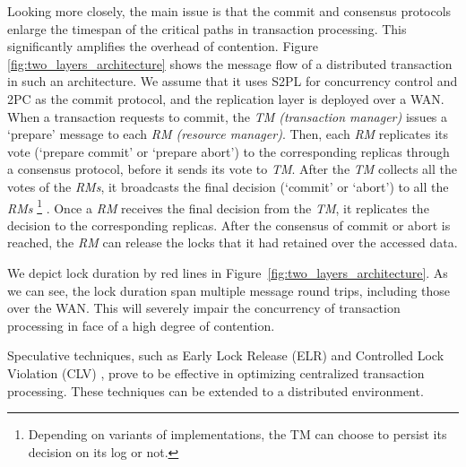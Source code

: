 \documentclass[conference]{IEEEtran}
\begin{document}
Looking more closely, the main issue is that the commit and consensus protocols enlarge the timespan of the critical paths in transaction processing.
This significantly amplifies the overhead of contention.
Figure \ref{fig:two_layers_architecture} shows the message flow of a distributed transaction in such an architecture. We assume that
it uses S2PL for concurrency control and 2PC as the commit protocol, and the replication layer is deployed over a WAN.
When a transaction requests to commit, the \emph{TM (transaction manager)} issues a `prepare' message to each \emph{RM (resource manager)}.
Then, each \emph{RM} replicates its vote (`prepare commit' or `prepare abort') to the corresponding replicas through a consensus protocol, before it
sends its vote to \emph{TM}.
After the \emph{TM} collects all the votes of the \emph{RMs},
it broadcasts the final decision (`commit' or `abort') to all the \emph{RMs}
\footnote{Depending on variants of implementations, the TM can choose to persist its decision on its log or not.}
.
Once a \emph{RM} receives the final decision from the \emph{TM}, it replicates the decision to the corresponding replicas.
After the consensus of commit or abort is reached, the \emph{RM}
can release the locks that it had retained over the accessed data.

We depict lock duration by red lines in Figure~\ref{fig:two_layers_architecture}.
As we can see, the lock duration span multiple message round trips, including those over the WAN.
This will severely impair the concurrency of transaction processing in face of a high degree of contention.

Speculative techniques, such as Early Lock Release (ELR) \cite{EfficientLocking:conf/vldb/KimuraGK12} and Controlled Lock Violation (CLV)
\cite{CLV:conf/sigmod/GraefeLKTV13}, prove to be effective in optimizing centralized transaction processing.
These techniques can be extended to a distributed environment.
\end{document}
